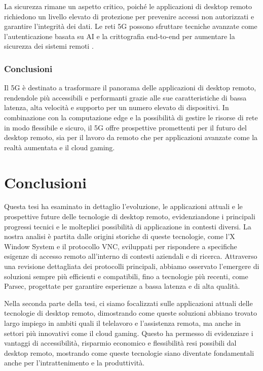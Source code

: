 \documentclass[12pt,a4paper,openright,twoside]{book}
\begin{document}
La sicurezza rimane un aspetto critico, poiché le applicazioni di desktop remoto richiedono un livello elevato di protezione per prevenire accessi non autorizzati e garantire l'integrità dei dati. Le reti 5G possono sfruttare tecniche avanzate come l'autenticazione basata su AI e la crittografia end-to-end per aumentare la sicurezza dei sistemi remoti \cite{Sahu2024}.

\subsection{Conclusioni}

Il 5G è destinato a trasformare il panorama delle applicazioni di desktop remoto, rendendole più accessibili e performanti grazie alle sue caratteristiche di bassa latenza, alta velocità e supporto per un numero elevato di dispositivi. In combinazione con la computazione edge e la possibilità di gestire le risorse di rete in modo flessibile e sicuro, il 5G offre prospettive promettenti per il futuro del desktop remoto, sia per il lavoro da remoto che per applicazioni avanzate come la realtà aumentata e il cloud gaming.





\chapter{Conclusioni}
\label{chap:conclusioni}

Questa tesi ha esaminato in dettaglio l’evoluzione, le applicazioni attuali e le prospettive future delle tecnologie di desktop remoto, evidenziandone i principali progressi tecnici e le molteplici possibilità di applicazione in contesti diversi. La nostra analisi è partita dalle origini storiche di queste tecnologie, come l’X Window System e il protocollo VNC, sviluppati per rispondere a specifiche esigenze di accesso remoto all'interno di contesti aziendali e di ricerca. Attraverso una revisione dettagliata dei protocolli principali, abbiamo osservato l’emergere di soluzioni sempre più efficienti e compatibili, fino a tecnologie più recenti, come Parsec, progettate per garantire esperienze a bassa latenza e di alta qualità.

Nella seconda parte della tesi, ci siamo focalizzati sulle applicazioni attuali delle tecnologie di desktop remoto, dimostrando come queste soluzioni abbiano trovato largo impiego in ambiti quali il telelavoro e l'assistenza remota, ma anche in settori più innovativi come il cloud gaming. Questo ha permesso di evidenziare i vantaggi di accessibilità, risparmio economico e flessibilità resi possibili dal desktop remoto, mostrando come queste tecnologie siano diventate fondamentali anche per l’intrattenimento e la produttività.
\end{document}
